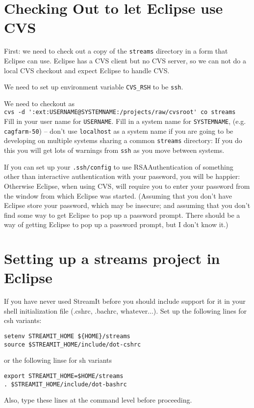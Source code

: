 \documentclass[11pt]{article}
\begin{document}




\section{Checking Out to let Eclipse use CVS}
\label{secCheckout}

First: we need to check out a copy of the {\tt streams} directory in a
form that Eclipse can use.
Eclipse has a CVS client but no CVS server, so we can not do a local
CVS checkout and expect Eclipse to handle CVS.

We need to set up environment variable {\tt CVS\_RSH} to be {\tt ssh}.

We need to checkout as\\
\verb+cvs -d ':ext:USERNAME@SYSTEMNAME:/projects/raw/cvsroot' co streams+\\
Fill in your user name for {\tt USERNAME}.  
Fill in a system name for {\tt SYSTEMNAME}, (e.g. {\tt cagfarm-50}) -- don't use {\tt  localhost}
as a system name if you are going to be developing on multiple systems
sharing a common {\tt streams} directory: If you do this you will get lots
of warnings from {\tt ssh} as you move between systems.

If you can set up your {\tt .ssh/config} to use RSAAuthentication of
something other than interactive authentication with your password,
you will be happier:  Otherwise Eclipse, when using CVS, will require
you to enter your password from the window from which Eclipse was
started. (Assuming that you don't have Eclipse store your
  password, which may be insecure; and assuming that you don't find
  some way to get Eclipse to pop up a password prompt.  There should
  be a way of getting Eclipse to pop up a password prompt, but I don't
know it.)

\section{Setting up a streams project in Eclipse}

If you have never used StreamIt before you should include support for
it in your shell initialization file (.cshrc, .bachrc, whatever...).
Set up the following lines for csh variants:
\begin{verbatim}
setenv STREAMIT_HOME ${HOME}/streams
source $STREAMIT_HOME/include/dot-cshrc
\end{verbatim}
or the following linse for sh variants
\begin{verbatim}
export STREAMIT_HOME=$HOME/streams
. $STREAMIT_HOME/include/dot-bashrc
\end{verbatim}
Also, type these lines at the command level before proceeding.
\end{document}
